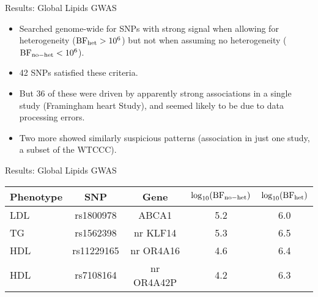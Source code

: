 \documentclass[ignorenonframetext]{beamer}
\def\BF{\text{BF}}
\def\BF{\rm BF}
\begin{document}
 
 \begin{frame}{Results: Global Lipids GWAS}

\begin{itemize}
\item Searched genome-wide for SNPs with strong signal when allowing
for heterogeneity ($\BF_{\rm het}>10^6$) but not when assuming no heterogeneity ($\BF_{\rm no-het}<10^6$).
\item 42 SNPs satisfied these criteria.
\item But 36 of these were driven by apparently strong associations in a single study (Framingham heart Study), and seemed likely to be due to data processing errors.
\item Two more showed similarly suspicious patterns (association in just one study, a subset of the WTCCC). 
\end{itemize}
\end{frame}

\begin{frame}{Results: Global Lipids GWAS}

\begin{table}[h!t]
\begin{center}
\begin{tabular}{ l c c c c }
\toprule
Phenotype & SNP & Gene & $\log_{10} ({\rm BF}_{\rm no-het})$ &  $\log_{10}({\rm BF}_{\rm het})$ \\
\midrule
LDL & rs1800978 & {\footnotesize  ABCA1} & 5.2  & 6.0  \\
TG  & rs1562398 & {\footnotesize nr KLF14} & 5.3 &  6.5 \\
HDL & rs11229165 & {\footnotesize nr OR4A16} & 4.6 & 6.4 \\
HDL & rs7108164 & {\footnotesize nr OR4A42P} & 4.2 & 6.3 \\ 
\bottomrule
\end{tabular}
\end{center}
\end{table}
\end{frame}
\end{document}
